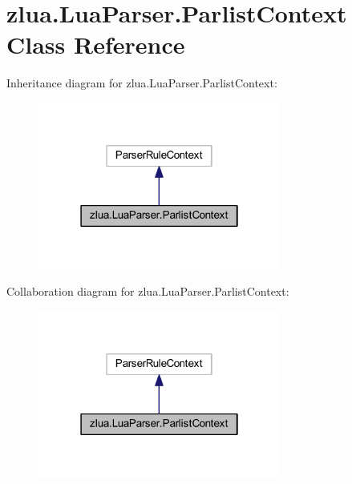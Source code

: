 \hypertarget{classzlua_1_1_lua_parser_1_1_parlist_context}{}\section{zlua.\+Lua\+Parser.\+Parlist\+Context Class Reference}
\label{classzlua_1_1_lua_parser_1_1_parlist_context}


Inheritance diagram for zlua.\+Lua\+Parser.\+Parlist\+Context\+:
\nopagebreak
\begin{figure}[H]
\begin{center}
\leavevmode
\includegraphics[width=226pt]{classzlua_1_1_lua_parser_1_1_parlist_context__inherit__graph}
\end{center}
\end{figure}


Collaboration diagram for zlua.\+Lua\+Parser.\+Parlist\+Context\+:
\nopagebreak
\begin{figure}[H]
\begin{center}
\leavevmode
\includegraphics[width=226pt]{classzlua_1_1_lua_parser_1_1_parlist_context__coll__graph}
\end{center}
\end{figure}
